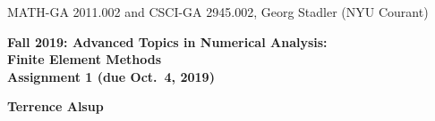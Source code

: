 \documentclass[11pt]{article}
\begin{document}
\begin{center}
  \vspace*{-2cm}
{\small MATH-GA 2011.002 and CSCI-GA 2945.002, Georg Stadler (NYU Courant)}
\end{center}
\vspace*{.5cm}
\begin{center}
\large \textbf{%
Fall 2019: Advanced Topics in Numerical Analysis: \\
Finite Element Methods \\
Assignment 1 (due Oct.\ 4, 2019)}
\end{center}
\vspace*{0.5cm}
\begin{center}
\Large \textbf{Terrence Alsup}
\end{center}


\end{document}
